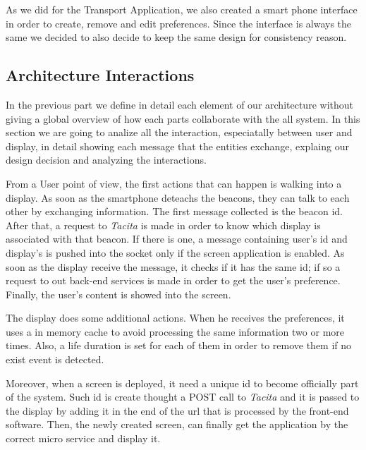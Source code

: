 \documentclass[]{usiinfbachelorproject}
\begin{document}
As we did for the Transport Application, we also created a smart phone interface in order to create, remove and edit preferences. Since the interface is always the same we decided to also decide to keep the same design for consistency reason.
\subsection{Architecture Interactions}
In the previous part we define in detail each element of our architecture without giving a global overview of how each parts collaborate with the all system. In this section we are going to analize all the interaction, especiatally between user and display, in detail showing each message that the entities exchange, explaing our design decision and analyzing the interactions.

From a User point of view, the first actions that can happen is walking into a display. As soon as the smartphone deteachs the beacons, they can talk to each other by exchanging information. The first message collected is the beacon id. After that, a request to \emph{Tacita} is made in order to know which display is associated with that beacon. If there is one, a message containing user's id and display's is pushed into the socket only if the screen application is enabled. As soon as the display receive the message, it checks if it has the same id; if so a request to out back-end services is made in order to get the user's preference. Finally, the user's content is showed into the screen.

The display does some additional actions. When he receives the preferences, it uses a in memory cache to avoid processing the same information two or more times. Also, a life duration is set for each of them in order to remove them if no exist event is detected.

Moreover, when a screen is deployed, it need a unique id to become officially part of the system. Such id is create thought a POST call to \emph{Tacita} and it is passed to the display by adding it in the end of the url that is processed by the front-end software.
Then, the newly created screen, can finally get the application by the correct micro service and display it.
\end{document}
